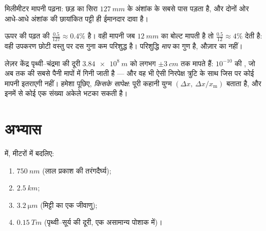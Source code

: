 \begin{omfigure}

{\small मिलीमीटर मापनी पढ़ना: छड़ का सिरा $\qty{127}{mm}$ के अंशांक के सबसे पास
पड़ता है, और दोनों ओर आधे-आधे अंशांक की छायांकित पट्टी ही ईमानदार दावा
है।}
\end{omfigure}

\begin{example}[सापेक्ष परिशुद्धि]\label{ex:g10:orders-of-magnitude:reading}
ऊपर की पढ़त की  $\frac{0.5}{127} \approx 0.4\%$ है। वही मापनी जब
$\qty{12}{mm}$ का बोल्ट मापती है तो $\frac{0.5}{12} \approx 4\%$ देती है: वही उपकरण छोटी वस्तु पर
दस गुना कम परिशुद्ध है। परिशुद्धि \emph{माप} का गुण है, औज़ार का नहीं।
\end{example}

\begin{remark}\label{rem:g10:orders-of-magnitude:precision}
लेज़र केंद्र पृथ्वी--चंद्रमा की दूरी $\qty{3.84e8}{m}$ को लगभग $\pm\qty{3}{cm}$ तक मापते
हैं: $10^{-10}$ की , जो अब तक की सबसे पैनी
मापों में गिनी जाती है --- और वह भी ऐसी निरपेक्ष त्रुटि के साथ जिस पर
कोई मापनी इतराएगी नहीं। हमेशा पूछिए, \emph{किसके सापेक्ष}: पूरी कहानी
युग्म $(\Delta x,\ \Delta x / x_{\text{m}})$ बताता है, और इनमें से कोई एक संख्या अकेले भटका सकती है।
\end{remark}

\section{अभ्यास}

\begin{exercise}[$\star$]\label{exo:g10:orders-of-magnitude:1}
 में, मीटरों में बदलिए:
\begin{enumerate}
  \item $\qty{750}{nm}$ (लाल प्रकाश की तरंगदैर्घ्य);
  \item $\qty{2.5}{km}$;
  \item $\qty{3.2}{\micro m}$ (मिट्टी का एक जीवाणु);
  \item $\qty{0.15}{Tm}$ (पृथ्वी--सूर्य की दूरी, एक असामान्य पोशाक में)।
\end{enumerate}
\end{exercise}

